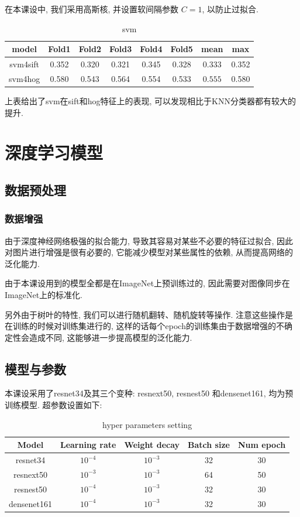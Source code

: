 \documentclass[lang=cn,12pt,a4paper]{elegantpaper}
\begin{document}
在本课设中, 我们采用高斯核, 并设置软间隔参数 $C=1$, 以防止过拟合.

\begin{table}[t]
    \centering
    \begin{tabular}{cccccccc}
    \hline
    model & Fold1 & Fold2 & Fold3 & Fold4 & Fold5 & mean & max\\
    \hline
    svm4sift & 0.352 & 0.320 & 0.321 & 0.345 & 0.328 & $\mathbf{0.333}$ & 0.352\\
    svm4hog & 0.580 & 0.543 & 0.564 & 0.554 & 0.533 & $\mathbf{0.555}$ & 0.580\\
    \hline
    \end{tabular}
    \caption{svm}
\end{table}

上表给出了svm在sift和hog特征上的表现, 可以发现相比于KNN分类器都有较大的提升.

\section{深度学习模型}
\subsection{数据预处理}
\subsubsection{数据增强}
由于深度神经网络极强的拟合能力, 导致其容易对某些不必要的特征过拟合, 因此对图片进行增强是很有必要的, 它能减少模型对某些属性的依赖, 从而提高网络的泛化能力.

由于本课设用到的模型全都是在ImageNet上预训练过的, 因此需要对图像同步在ImageNet上的标准化.

另外由于树叶的特性, 我们可以进行随机翻转、随机旋转等操作. 注意这些操作是在训练的时候对训练集进行的, 这样的话每个epoch的训练集由于数据增强的不确定性会造成不同, 这能够进一步提高模型的泛化能力.
\subsection{模型与参数}
本课设采用了resnet34及其三个变种: resnext50\cite{xie2017aggregated}, resnest50\cite{zhang2020resnest} 和densenet161\cite{huang2018densely}, 均为预训练模型.
超参数设置如下:
\begin{table}[ht]
    \centering
    \begin{tabular}{ccccc}
    \hline
    Model & Learning rate & Weight decay & Batch size & Num epoch\\
    \hline
    resnet34 & $10^{-4}$ & $10^{-3}$ & 32 & 30\\
    resnext50 & $10^{-3}$ & $10^{-3}$ & 64 & 50\\
    resnest50 & $10^{-4}$ & $10^{-3}$ & 32 & 30\\
    densenet161 & $10^{-4}$ & $10^{-3}$ & 32 & 30\\
    \hline
    \end{tabular}
    \caption{hyper parameters setting}
    \label{tab:example}
    \end{table}
\end{document}
